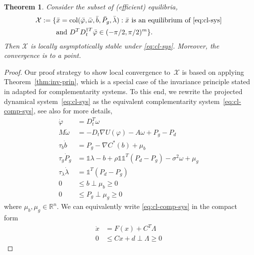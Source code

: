 \documentclass[journal]{IEEEtran}
\newcommand{\w}{\omega}
\newcommand{\1}{\mathds 1}
\newcommand{\vp}{\varphi}
\renewcommand{\l}{\lambda}
\DeclareMathOperator{\col}{col}
\newtheorem{theorem}{Theorem}[section]
\theoremstyle{remark}
\theoremstyle{definition}
\begin{document}
\begin{theorem}
  Consider the subset of (efficient) equilibria,
  \begin{align*}
    \mathcal X:=\{& \bar{x} = \col(\bar \vp,\bar\w,\bar b,\bar
    P_g,\bar \l) : \bar{x} \text{ is an equilibrium
      of~\eqref{eq:cl-sys}}
    \\&\text{and }D^TD_t^{\dagger
      T}\bar\vp\in(-\pi/2,\pi/2)^m\}.
  \end{align*}
  Then $\mathcal X$ is locally asymptotically stable under
  \eqref{eq:cl-sys}. Moreover, the convergence is to a point.
\end{theorem}
%
\begin{proof}
  Our proof strategy to show local convergence to~$\mathcal X$ is
  based on applying Theorem~\ref{thm:inv-prin}, which is a special
  case of the invariance principle stated in
  \cite{brogliato2005krakovskii} adapted for complementarity
  systems. To this end, we rewrite the projected dynamical
  system~\eqref{eq:cl-sys} as the equivalent complementarity
  system~\eqref{eq:cl-comp-sys}, see also \cite[Theorem
  1]{brogliato2006equivalence} for more details,
  \begin{subequations}\label{eq:cl-comp-sys}
    \begin{align}
      \dot \vp&=D_t^T\w\label{eq:vp-comp-dyn}
      \\
      M\dot \w&=-D_t\nabla U(\vp)-A\w+P_g-P_d\label{eq:w-comp-dyn}
      \\
      \tau_b \dot b&=P_g-\nabla C^*(b)+\mu_b\label{eq:b-comp-dyn}
      \\
      \tau_g\dot P_g&=\1\l-b+\rho \1\1^T (P_d-P_g) -\sigma^2\w+\mu_g\label{eq:Pg-comp-dyn}
      \\
      \tau_\l\dot \l&=\1^T(P_d-P_g)\label{eq:l-comp-dyn}\\
      0&\leq  b\perp \mu_b\geq0\label{eq:b-comp-slack}\\
      0&\leq P_g\perp  \mu_g\geq0\label{eq:Pg-comp-slack}
    \end{align}
  \end{subequations}
  where $\mu_b,\mu_g\in\mathbb R^n$. We can equivalently write \eqref{eq:cl-comp-sys} in the compact form
  \begin{subequations}\label{eq:cl-sys-compact}
    \begin{align}
      \dot x&=F(x)+C^T\Lambda\\
      0&\leq Cx+d\perp \Lambda\geq0\label{eq:cl-sys-compact-slackness}

\end{align}
\end{subequations}
\end{proof}
\end{document}
